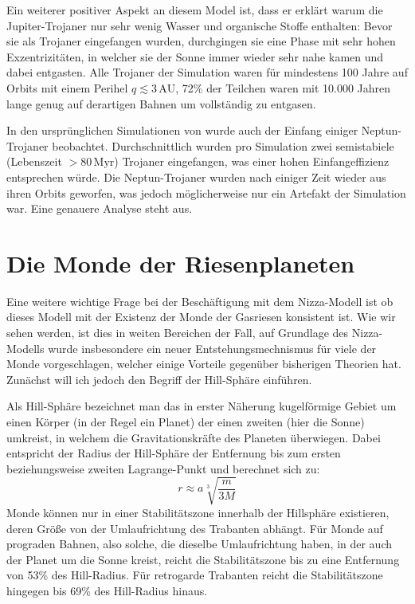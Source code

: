 \documentclass[12pt,a4paper,twoside]{article}
\newcommand{\AU}{\,\mathrm{AU}}
\begin{document}
Ein weiterer positiver Aspekt an diesem Model ist, dass er erklärt warum die Jupiter-Trojaner nur sehr wenig Wasser und organische Stoffe enthalten: %
Bevor sie als Trojaner eingefangen wurden, durchgingen sie eine Phase mit sehr hohen Exzentrizitäten, in welcher sie der Sonne immer wieder sehr nahe kamen und dabei entgasten.
Alle Trojaner der Simulation waren für mindestens 100 Jahre auf Orbits mit einem Perihel $q\lesssim 3 \AU$, 72\% der Teilchen waren mit 10.000 Jahren lange genug auf derartigen Bahnen um vollständig zu entgasen\cite{Morbidelli2005}.

In den ursprünglichen Simulationen von \cite{Tsiganis2005} wurde auch der Einfang einiger Neptun-Trojaner beobachtet. Durchschnittlich wurden pro Simulation zwei semistabiele (Lebenszeit $>80 \, \mathrm{Myr}$) Trojaner eingefangen, was einer hohen Einfangeffizienz entsprechen würde\cite{Tsiganis2005}.
Die Neptun-Trojaner wurden nach einiger Zeit wieder aus ihren Orbits geworfen, was jedoch möglicherweise nur ein Artefakt der Simulation war\cite{Tsiganis2005}. %
Eine genauere Analyse steht aus. %

\FloatBarrier
\section{Die Monde der Riesenplaneten}\label{Monde}
Eine weitere wichtige Frage bei der Beschäftigung mit dem Nizza-Modell ist ob dieses Modell mit der Existenz der Monde der Gasriesen konsistent ist.
Wie wir sehen werden, ist dies in weiten Bereichen der Fall, auf Grundlage des Nizza-Modells wurde insbesondere ein neuer Entstehungsmechnismus für viele der Monde vorgeschlagen, welcher einige Vorteile gegenüber bisherigen Theorien hat. Zunächst will ich jedoch den Begriff der Hill-Sphäre einführen.

Als Hill-Sphäre bezeichnet man das in erster Näherung kugelförmige Gebiet um einen Körper (in der Regel ein Planet) der einen zweiten (hier die Sonne) umkreist, in welchem die Gravitationskräfte des Planeten überwiegen. Dabei entspricht der Radius der Hill-Sphäre der Entfernung bis zum ersten beziehungsweise zweiten Lagrange-Punkt und berechnet sich zu\cite{Sheppard2005}:
\begin{equation} 
r \approx a \sqrt[3]{\frac{m}{3 M}}
\end{equation} %
Monde können nur in einer Stabilitätszone innerhalb der Hillsphäre existieren, deren Größe von der Umlaufrichtung des Trabanten abhängt. Für Monde auf prograden Bahnen, also solche, die dieselbe Umlaufrichtung haben, in der auch der Planet um die Sonne kreist, reicht die Stabilitätszone bis zu eine Entfernung von 53\% des Hill-Radius.
Für retrogarde Trabanten reicht die Stabilitätszone hingegen bis 69\% des Hill-Radius hinaus\cite{Hamilton1997}.
\end{document}
